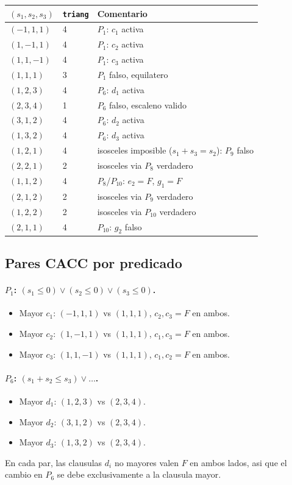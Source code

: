 \documentclass[12pt,a4paper]{article}
\begin{document}
\begin{center}
\begin{tabular}{lll}
\toprule
$(s_1,s_2,s_3)$ & \texttt{triang} & Comentario \\
\midrule
$(-1,1,1)$ & 4 & $P_1$: $c_1$ activa \\
$(1,-1,1)$ & 4 & $P_1$: $c_2$ activa \\
$(1,1,-1)$ & 4 & $P_1$: $c_3$ activa \\
$(1,1,1)$  & 3 & $P_1$ falso, equilatero \\
$(1,2,3)$  & 4 & $P_6$: $d_1$ activa \\
$(2,3,4)$  & 1 & $P_6$ falso, escaleno valido \\
$(3,1,2)$  & 4 & $P_6$: $d_2$ activa \\
$(1,3,2)$  & 4 & $P_6$: $d_3$ activa \\
$(1,2,1)$  & 4 & isosceles imposible ($s_1+s_3=s_2$): $P_9$ falso \\
$(2,2,1)$  & 2 & isosceles via $P_8$ verdadero \\
$(1,1,2)$  & 4 & $P_8$/$P_{10}$: $e_2 = F$, $g_1=F$ \\
$(2,1,2)$  & 2 & isosceles via $P_9$ verdadero \\
$(1,2,2)$  & 2 & isosceles via $P_{10}$ verdadero \\
$(2,1,1)$  & 4 & $P_{10}$: $g_2$ falso \\
\bottomrule
\end{tabular}
\end{center}

\subsection{Pares CACC por predicado}

\paragraph{$P_1$: $(s_1\le 0)\vee(s_2\le 0)\vee(s_3\le 0)$.}
\begin{itemize}
  \item Mayor $c_1$: $(-1,1,1)$ vs $(1,1,1)$, $c_2,c_3 = F$ en ambos.
  \item Mayor $c_2$: $(1,-1,1)$ vs $(1,1,1)$, $c_1,c_3 = F$ en ambos.
  \item Mayor $c_3$: $(1,1,-1)$ vs $(1,1,1)$, $c_1,c_2 = F$ en ambos.
\end{itemize}

\paragraph{$P_6$: $(s_1+s_2 \le s_3)\vee\ldots$.}
\begin{itemize}
  \item Mayor $d_1$: $(1,2,3)$ vs $(2,3,4)$.
  \item Mayor $d_2$: $(3,1,2)$ vs $(2,3,4)$.
  \item Mayor $d_3$: $(1,3,2)$ vs $(2,3,4)$.
\end{itemize}
En cada par, las clausulas $d_i$ no mayores valen $F$ en ambos lados, asi que el cambio en
$P_6$ se debe exclusivamente a la clausula mayor.
\end{document}
